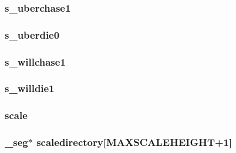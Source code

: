 \label{WL__DEF_8H_a24aef46c334871703aaa35ab19126202}
\hypertarget{WL__DEF_8H_aee78561567802289ba74c431ef1418c2}{
\subsubsection[{s\_\-uberchase1}]{ {\bf s\_\-uberchase1}}}
\label{WL__DEF_8H_aee78561567802289ba74c431ef1418c2}
\hypertarget{WL__DEF_8H_adf6b859577c7a0a17249de32005ec8e9}{
\subsubsection[{s\_\-uberdie0}]{ {\bf s\_\-uberdie0}}}
\label{WL__DEF_8H_adf6b859577c7a0a17249de32005ec8e9}
\hypertarget{WL__DEF_8H_ae65fa4935118c69149160b6352fb70b3}{
\subsubsection[{s\_\-willchase1}]{ {\bf s\_\-willchase1}}}
\label{WL__DEF_8H_ae65fa4935118c69149160b6352fb70b3}
\hypertarget{WL__DEF_8H_a3b3157828814f6b7b9a74c3adc792a27}{
\subsubsection[{s\_\-willdie1}]{ {\bf s\_\-willdie1}}}
\label{WL__DEF_8H_a3b3157828814f6b7b9a74c3adc792a27}
\hypertarget{WL__DEF_8H_a849bfcd0a34b52dc70d3d9fa35a9ffc7}{
\subsubsection[{scale}]{ {\bf scale}}}
\label{WL__DEF_8H_a849bfcd0a34b52dc70d3d9fa35a9ffc7}
\hypertarget{WL__DEF_8H_a79aa20f0658411ee8fe8706f15753026}{
\subsubsection[{scaledirectory}]{ \_\-seg$\ast$ {\bf scaledirectory}\mbox{[}MAXSCALEHEIGHT+1\mbox{]}}}
